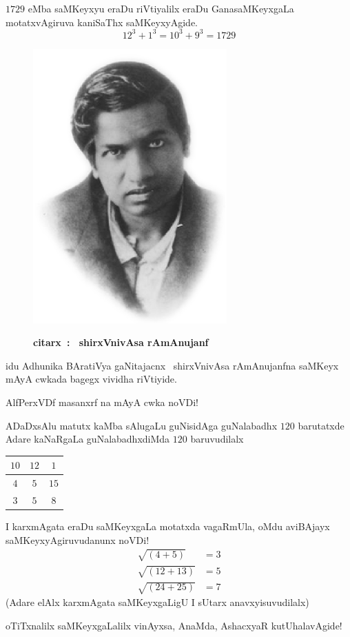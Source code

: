 $1729$ eMba saMKeyxyu eraDu riVtiyalilx eraDu GanasaMKeyxgaLa motatxvAgiruva kaniSaThx saMKeyxyAgide.
$$
12^3 + 1^3 =10^3 + 9 ^3 = 1729
$$
\begin{figure}[H]
\centering\includegraphics[scale=0.8]{src/figures/Ramanujan.eps}

{\bf citarx~: ~shirxVnivAsa rAmAnujanf}
\end{figure}
idu Adhunika BAratiVya gaNitajacnx~ shirxVnivAsa rAmAnujanfna saMKeyx mAyA cwkada bagegx vividha riVtiyide.

AlfPerxVDf  masanxrf na mAyA cwka noVDi!

ADaDxsAlu matutx kaMba sAlugaLu guNisidAga guNalabadhx $120$ barutatxde Adare kaNaRgaLa guNalabadhxdiMda $120$ baruvudilalx
\begin{center}
\begin{tabular}{|c|c|c|}
\hline
$10$ & $12$ & $1$\\
\hline
$4$ & $5$ & $15$\\
\hline
$3$ & $5$ & $8$\\
\hline
\end{tabular}
\end{center}

I karxmAgata eraDu saMKeyxgaLa motatxda vagaRmUla, oMdu aviBAjayx saMKeyxyAgiruvudanunx noVDi!
\begin{align*}
  \sqrt{(4+5)} & = 3\\
  \sqrt{(12+13)} & = 5\\
  \sqrt{(24+25)} &= 7
\end{align*}
(Adare elAlx karxmAgata saMKeyxgaLigU I sUtarx anavxyisuvudilalx)

oTiTxnalilx saMKeyxgaLalilx vinAyxsa, AnaMda, AshacxyaR kutUhalavAgide! 



